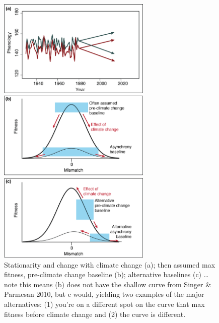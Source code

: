 \documentclass[11pt,letterpaper]{article}
\begin{document}
\begin{figure}[ht!]
\caption{Stationarity and change with climate change (a); then assumed max fitness, pre-climate change baseline (b); alternative baselines (c) … note this means (b) does not have the shallow curve from Singer \& Parmesan 2010, but c would, yielding two examples of the major alternatives: (1) you’re on a different spot on the curve that max fitness before climate change and (2) the curve is different.}
\begin{center}
\includegraphics[width=0.65\textwidth]{fig2.png}
\end{center}
\end{figure}
\clearpage

\end{document}
